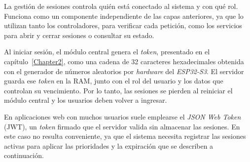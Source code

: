 La gestión de sesiones controla quién está conectado al sistema y con qué rol. Funciona como un componente independiente de las capas anteriores, ya que lo utilizan tanto los controladores, para verificar cada petición, como los servicios para abrir y cerrar sesiones o consultar su estado.



Al iniciar sesión, el módulo central genera el \emph{token}, presentado en el capítulo~\ref{Chapter2}, como una cadena de 32 caracteres hexadecimales obtenida con el generador de números aleatorios por \emph{hardware} del \emph{ESP32-S3}. El servidor guarda ese \emph{token} en la RAM, junto con el rol del usuario y los datos que controlan su vencimiento. Por lo tanto, las sesiones se pierden al reiniciar el módulo central y los usuarios deben volver a ingresar.


En aplicaciones web con muchos usuarios suele emplearse el \emph{JSON Web Token} (JWT), un \emph{token} firmado que el servidor valida sin almacenar las sesiones. En este caso no resulta conveniente, ya que el sistema necesita registrar las sesiones activas para aplicar las prioridades y la expiración que se describen a continuación.



